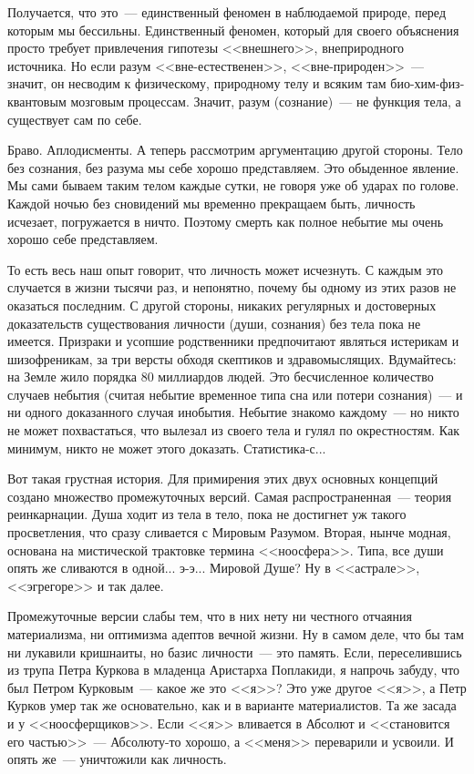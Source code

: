 \documentclass{scrbook}
\newcommand{\flqq}{<<}
\newcommand{\frqq}{>>}
\newcommand{\mdash}{~--- }
\begin{document}
Получается, что это{\mdash}единственный феномен в наблюдаемой природе, перед которым мы бессильны. Единственный феномен, который для своего объяснения просто требует привлечения гипотезы {\flqq}внешнего{\frqq}, внеприродного источника. Но если разум {\flqq}вне-естественен{\frqq}, {\flqq}вне-природен{\frqq}{\mdash}значит, он несводим к физическому, природному телу и всяким там био-хим-физ-квантовым мозговым процессам. Значит, разум (сознание){\mdash}не функция тела, а существует сам по себе.

Браво. Аплодисменты. А теперь рассмотрим аргументацию другой стороны. Тело без сознания, без разума мы себе хорошо представляем. Это обыденное явление. Мы сами бываем таким телом каждые сутки, не говоря уже об ударах по голове. Каждой ночью без сновидений мы временно прекращаем быть, личность исчезает, погружается в ничто. Поэтому смерть как полное небытие мы очень хорошо себе представляем.

То есть весь наш опыт говорит, что личность может исчезнуть. С каждым это случается в жизни тысячи раз, и непонятно, почему бы одному из этих разов не оказаться последним. С другой стороны, никаких регулярных и достоверных доказательств существования личности (души, сознания) без тела пока не имеется. Призраки и усопшие родственники предпочитают являться истерикам и шизофреникам, за три версты обходя скептиков и здравомыслящих. Вдумайтесь: на Земле жило порядка 80 миллиардов людей. Это бесчисленное количество случаев небытия (считая небытие временное типа сна или потери сознания){\mdash}и ни одного доказанного случая инобытия. Небытие знакомо каждому{\mdash}но никто не может похвастаться, что вылезал из своего тела и гулял по окрестностям. Как минимум, никто не может этого доказать. Статисти\mbox{ка-с}...

Вот такая грустная история. Для примирения этих двух основных концепций создано множество промежуточных версий. Самая распространенная{\mdash}теория реинкарнации. Душа ходит из тела в тело, пока не достигнет уж такого просветления, что сразу сливается с Мировым Разумом. Вторая, нынче модная, основана на мистической трактовке термина {\flqq}ноосфера{\frqq}. Типа, все души опять же сливаются в одной... э-э... Мировой Душе? Ну в {\flqq}астрале{\frqq}, {\flqq}эгрегоре{\frqq} и так далее.

Промежуточные версии слабы тем, что в них нету ни честного отчаяния материализма, ни оптимизма адептов вечной жизни. Ну в самом деле, что бы там ни лукавили кришнаиты, но базис личности{\mdash}это память. Если, переселившись из трупа Петра Куркова в младенца Аристарха Поплакиди, я напрочь забуду, что был Петром Курковым{\mdash}какое же это {\flqq}я{\frqq}? Это уже другое {\flqq}я{\frqq}, а Петр Курков умер так же основательно, как и в варианте материалистов. Та же засада и у {\flqq}ноосферщиков{\frqq}. Если {\flqq}я{\frqq} вливается в Абсолют и {\flqq}становится его частью{\frqq}{\mdash}Абсолюту-то хорошо, а {\flqq}меня{\frqq} переварили и усвоили. И опять же{\mdash}уничтожили как личность.
\end{document}
